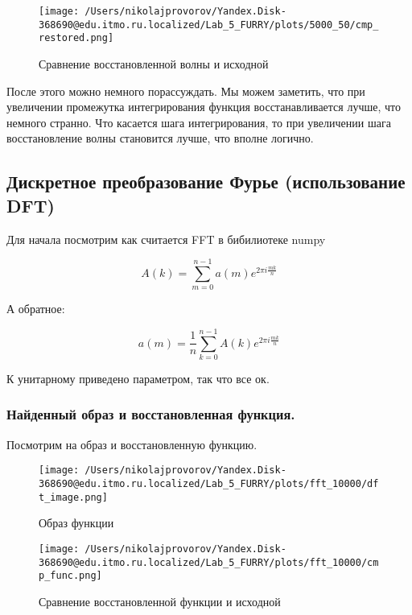 \clearpage

\begin{figure}[ht]
    \centering
    \texttt{[image: /Users/nikolajprovorov/Yandex.Disk-368690@edu.itmo.ru.localized/Lab\_5\_FURRY/plots/5000\_50/cmp\_restored.png]}
    \caption{Сравнение восстановленной волны и исходной}
\end{figure}

После этого можно немного порассуждать. Мы можем заметить, что при увеличении промежутка интегрирования функция восстанавливается лучше, что немного странно. Что касается шага интегрирования, то при увеличении шага восстановление волны становится лучше, что вполне логично.

\clearpage

\subsection{Дискретное преобразование Фурье (использование DFT)}

Для начала посмотрим как считается FFT в бибилиотеке numpy

\begin{equation}
    A(k) = \sum_{m = 0}^{n - 1}a(m)e^{2\pi i\frac{mk}{n}}
\end{equation}

А обратное:

\begin{equation}
    a(m) = \frac{1}{n}\sum_{k = 0}^{n - 1}A(k)e^{2\pi i\frac{mk}{n}}
\end{equation}

К унитарному приведено параметром, так что все ок.

\subsubsection{Найденный образ и восстановленная функция.}

Посмотрим на образ и восстановленную функцию.

\begin{figure}[ht]
    \centering
    \texttt{[image: /Users/nikolajprovorov/Yandex.Disk-368690@edu.itmo.ru.localized/Lab\_5\_FURRY/plots/fft\_10000/dft\_image.png]}
    \caption{Образ функции}
\end{figure}

\clearpage

\begin{figure}[ht]
    \centering
    \texttt{[image: /Users/nikolajprovorov/Yandex.Disk-368690@edu.itmo.ru.localized/Lab\_5\_FURRY/plots/fft\_10000/cmp\_func.png]}
    \caption{Сравнение восстановленной функции и исходной}
\end{figure}

